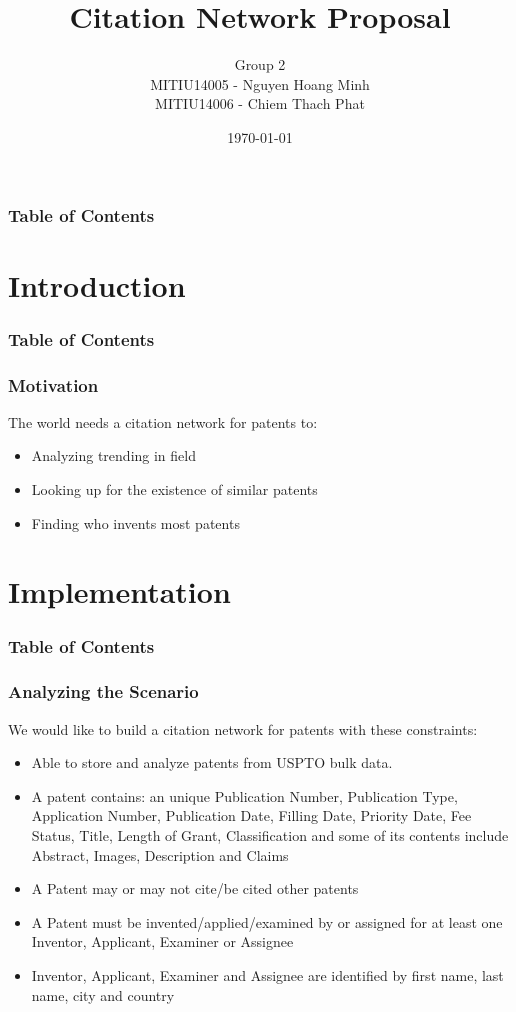 \documentclass{beamer}
\title[Citation Network Proposal]{Citation Network Proposal}
\author[Group 2 - ADB Course]{Group 2\\MITIU14005 - Nguyen Hoang Minh \\ MITIU14006 - Chiem Thach Phat}
\institute[HCMIU]{Ho Chi Minh City, International University}
\date{\today}
\begin{document}
\begin{frame}
\titlepage
\end{frame}

\begin{frame}
\frametitle{Table of Contents}
\tableofcontents
\end{frame}
\section{Introduction}
\begin{frame}
\frametitle{Table of Contents}
\tableofcontents[currentsection]
\end{frame}

\begin{frame}
\frametitle{Motivation}
The world needs a citation network for patents to:
\begin{itemize}
\item Analyzing trending in field
\item Looking up for the existence of similar patents
\item Finding who invents most patents
\end{itemize}
\end{frame}

\section{Implementation}
\begin{frame}
\frametitle{Table of Contents}
\tableofcontents[currentsection]
\end{frame}

\begin{frame}
\frametitle{Analyzing the Scenario}
We would like to build a citation network for patents with these constraints:
\begin{itemize}
\item Able to store and analyze patents from USPTO bulk data.
\item A patent contains: an unique Publication Number, Publication Type, Application Number, Publication Date, Filling Date, Priority Date, Fee Status, Title, Length of Grant, Classification and some of its contents include Abstract, Images, Description and Claims
\item A Patent may or may not cite/be cited other patents
\item A Patent must be invented/applied/examined by or assigned for at least one Inventor, Applicant, Examiner or Assignee
\item Inventor, Applicant, Examiner and Assignee are identified by first name, last name, city and country
\end{itemize}
\end{frame}
\end{document}
